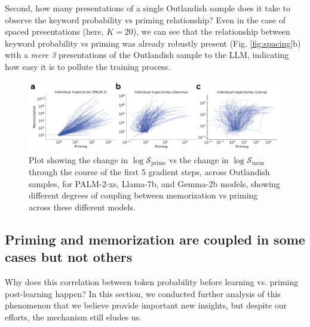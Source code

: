 \documentclass[11pt, a4paper, logo, copyright]{googledeepmind}
\theoremstyle{plain}
\theoremstyle{definition}
\theoremstyle{remark}
\begin{document}
Second, how many presentations of a single Outlandish sample does it take to observe the keyword probability vs priming relationship? Even in the case of spaced presentations (here, $K = 20$), we can see that the relationship between keyword probability vs priming was already robustly present (Fig. \ref{fig:spacing}b) with a \textit{mere 3} presentations of the Outlandish sample to the LLM, indicating how easy it is to pollute the training process. 



\begin{figure}[h]
\vspace{0mm}
    \centering \includegraphics[scale=.32,clip]{figures/grads.pdf}
    \vspace{-1mm}
    \caption{Plot showing the change in $\log \mathcal{S}_\text{prime}$ vs the change in $\log \mathcal{S}_\text{mem}$ through the course of the first 5 gradient steps, across Outlandish samples, for PALM-2-xs, Llama-7b, and Gemma-2b models, showing different degrees of coupling between memorization vs priming across these different models.} \label{fig:grads}
  \vspace{-0mm}
\end{figure}
\subsection{Priming and memorization are coupled in some cases but not others}
\label{sec:coupled}


Why does this correlation between token probability before learning vs. priming post-learning happen? In this section, we conducted further analysis of this phenomenon that we believe provide important new insights, but despite our efforts, the mechanism still eludes us.
\end{document}
